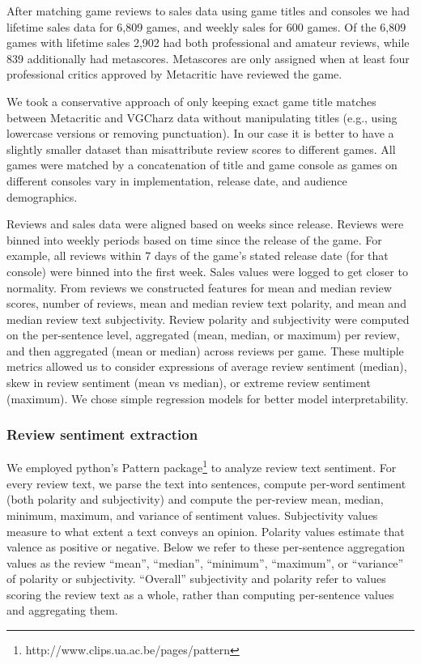 \documentclass[letterpaper]{article}
\begin{document}
After matching game reviews to sales data using game titles and consoles we had lifetime sales data for 6,809 games, and weekly sales for 600 games. Of the 6,809 games with lifetime sales 2,902 had both professional and amateur reviews, while 839 additionally had metascores. Metascores are only assigned when at least four professional critics approved by Metacritic have reviewed the game.

We took a conservative approach of only keeping exact game title matches between Metacritic and VGCharz data without manipulating titles (e.g., using lowercase versions or removing punctuation). In our case it is better to have a slightly smaller dataset than misattribute review scores to different games. All games were matched by a concatenation of title and game console as games on different consoles vary in implementation, release date, and audience demographics. 

Reviews and sales data were aligned based on weeks since release. Reviews were binned into weekly periods based on time since the release of the game. For example, all reviews within 7 days of the game's stated release date (for that console) were binned into the first week. Sales values were logged to get closer to normality. From reviews we constructed features for mean and median review scores, number of reviews, mean and median review text polarity, and mean and median review text subjectivity. Review polarity and subjectivity were computed on the per-sentence level, aggregated (mean, median, or maximum) per review, and then aggregated (mean or median) across reviews per game. These multiple metrics allowed us to consider expressions of average review sentiment (median), skew in review sentiment (mean vs median), or extreme review sentiment (maximum). We chose simple regression models for better model interpretability.

\subsubsection{Review sentiment extraction}
We employed python's Pattern package\footnote{http://www.clips.ua.ac.be/pages/pattern} to analyze review text sentiment. For every review text, we parse the text into sentences, compute per-word sentiment (both polarity and subjectivity) and compute the per-review mean, median, minimum, maximum, and variance of sentiment values. Subjectivity values measure to what extent a text conveys an opinion. Polarity values estimate that valence as positive or negative. Below we refer to these per-sentence aggregation values as the review ``mean'', ``median'', ``minimum'', ``maximum'', or ``variance'' of polarity or subjectivity. ``Overall'' subjectivity and polarity refer to values scoring the review text as a whole, rather than computing per-sentence values and aggregating them.
\end{document}
